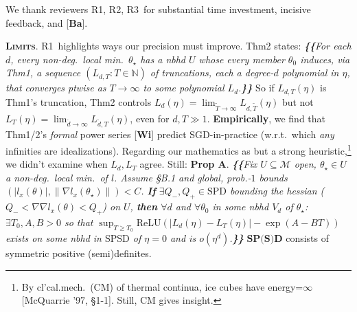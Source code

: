 \documentclass[12pt]{colt2021} %
\newcommand{\Ra}{\textmd{\textsf{\color{purple!50} {R1}}}}
\newcommand{\Rb}{\textmd{\textsf{\color{green!60}  {R2}}}}
\newcommand{\Rc}{\textmd{\textsf{\color{blue!50}   {R3}}}}
\newcommand{\Mm}{\mathcal{M}}
\newcommand{\NN}{\mathbb{N}}
\newcommand{\RR}{\mathbb{R}}
\newcommand{\pag}[1]{\textmd{{\color{gray}Pg}{#1}}}
\newcommand{\pgph}[1]{\textmd{{\color{gray}Par}{#1}}}
\newcommand{\thm}[1]{\textmd{{\color{gray}Thm}{#1}}}
\newcommand{\cit}[1]{[\textbf{#1}]}
\newcommand{\moosect}[1]{\par\noindent\hspace{-1cm}\textsc{\textbf{#1}}.}
\begin{document}
\title{}

    \newcommand{\LaT}{\Lambda_{\text{\tiny\VarClock}}}
    \newcommand{\Lad}{\Lambda_{\text{\tiny\Thermo{4}}}}

    \noindent
    We thank reviewers \Ra, \Rb, \Rc\ for substantial time investment, incisive feedback, and \cit{Ba}. 

\moosect{Limits}
    \Ra\ highlights ways our precision must improve. %
    \thm{2} states:
    \emph{\textbf{\{\!\{}For each $d$, every non-deg.\ local min.\ $\theta_\star$ has a nbhd $U$
        whose every member $\theta_0$ induces, via \thm{1}, a
        sequence $(L_{d,T} : T\in\NN)$ of truncations, each a degree-$d$ polynomial
        in $\eta$, that converges ptwise 
        as $T\to \infty$ to some polynomial $L_d$.\textbf{\}\!\}}}
    \noindent
    So if $L_{d,T}(\eta)$ is \thm{1}'s truncation, \thm{2} controls $L_d(\eta)
    = \lim_{\tilde T\to\infty} L_{d,\tilde T}(\eta)$ but not $L_T(\eta) =
    \lim_{\tilde d\to\infty} L_{\tilde d,T}(\eta)$, even for $d,T\gg 1$. 
    \textbf{Empirically}, we find that \thm{1/2}'s \emph{formal} power series
    \cit{Wi} predict SGD-in-practice (w.r.t.\ which \emph{any} infinities are
    idealizations).   
    Regarding our mathematics as but a strong
    heuristic,\footnote{%
        By cl'cal.mech.\ (CM) of thermal continua, ice cubes have
        energy=$\infty$ [McQuarrie '97, \S{1-1}].
        Still, CM gives insight.
    } we didn't examine when 
    $L_d, L_T$ agree.  Still:
    \textbf{Prop A}.\emph{
    \textbf{\{\!\{}Fix $U\subseteq \Mm$ open, %
        $\theta_\star\in U$ a non-deg.\ local min.\ of $l$.
        Assume \S{B.1} and global, prob.-$1$ bounds $(|l_x(\theta)|,\|\nabla
        l_x(\theta_\star)\|)<C$.
        \textbf{If} $\exists Q_-,Q_+\in \text{SPD}$ bounding the hessian
        ($Q_- < \nabla\nabla l_x(\theta)<Q_+$) on $U$,
        \textbf{then} $\forall d$ and $\forall\theta_0$ in
        some nbhd $V_d$ of $\theta_\star$: $\exists T_0,A,B>0$ 
        so that
        $\sup_{T\geq T_0} \text{ReLU}(|L_d(\eta)-L_T(\eta)|-\exp(A-BT))$
        exists on some nbhd in $\text{SPSD}$ of
        $\eta=0$ and is
        $o(\eta^d)$.\textbf{\}\!\}}
    }
    $\textbf{SP(S)D}$ consists of symmetric positive
    (semi)definites.
\end{document}
